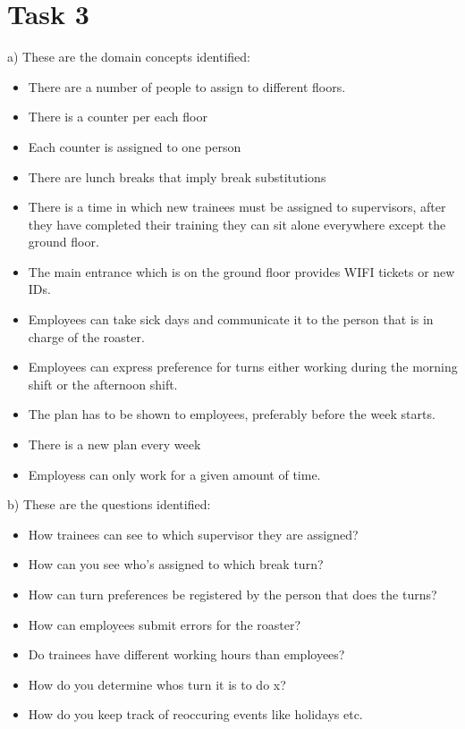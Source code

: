\chapter{Task 3}
\begin{elenco}
	\item a) These are the domain concepts identified:
	\begin{itemize}
		\item There are a number of people to assign to different floors.
		\item There is a counter per each floor
		\item Each counter is assigned to one person
		\item There are lunch breaks that imply break substitutions 
		\item There is a time in which new trainees must be assigned to supervisors, after they have completed their training they can sit alone everywhere except the ground floor.
		\item The main entrance which is on the ground floor provides WIFI tickets or new IDs.
		\item Employees can take sick days and communicate it to the person that is in charge of the roaster.
		\item Employees can express preference for turns either working during the morning shift or the afternoon shift. 
		\item The plan has to be shown to employees, preferably before the week starts. 
		\item There is a new plan every week
		\item Employess can only work for a given amount of time.
	\end{itemize}
	\item b) These are the questions identified:
	\begin{itemize}
		\item How trainees can see to which supervisor they are assigned?
		\item How can you see who's assigned to which break turn?
		\item How can turn preferences be registered by the person that does the turns?
		\item How can employees submit errors for the roaster?
		\item Do trainees have different working hours than employees?
		\item How do you determine whos turn it is to do x?
		\item How do you keep track of reoccuring events like holidays etc.

\end{itemize}
\end{elenco}
